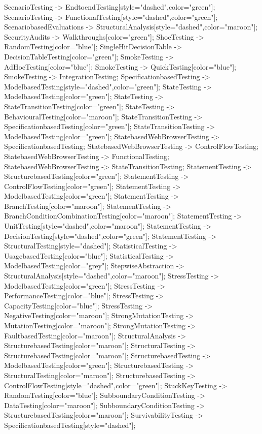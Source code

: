 \documentclass{article}
\begin{document}
{ScenarioTesting -> EndtoendTesting[style="dashed",color="green"];
ScenarioTesting -> FunctionalTesting[style="dashed",color="green"];
ScenariobasedEvaluations -> StructuralAnalysis[style="dashed",color="maroon"];
SecurityAudits -> Walkthroughs[color="green"];
ShoeTesting -> RandomTesting[color="blue"];
SingleHitDecisionTable -> DecisionTableTesting[color="green"];
SmokeTesting -> AdHocTesting[color="blue"];
SmokeTesting -> QuickTesting[color="blue"];
SmokeTesting -> IntegrationTesting;
SpecificationbasedTesting -> ModelbasedTesting[style="dashed",color="green"];
StateTesting -> ModelbasedTesting[color="green"];
StateTesting -> StateTransitionTesting[color="green"];
StateTesting -> BehaviouralTesting[color="maroon"];
StateTransitionTesting -> SpecificationbasedTesting[color="green"];
StateTransitionTesting -> ModelbasedTesting[color="green"];
StatebasedWebBrowserTesting -> SpecificationbasedTesting;
StatebasedWebBrowserTesting -> ControlFlowTesting;
StatebasedWebBrowserTesting -> FunctionalTesting;
StatebasedWebBrowserTesting -> StateTransitionTesting;
StatementTesting -> StructurebasedTesting[color="green"];
StatementTesting -> ControlFlowTesting[color="green"];
StatementTesting -> ModelbasedTesting[color="green"];
StatementTesting -> BranchTesting[color="maroon"];
StatementTesting -> BranchConditionCombinationTesting[color="maroon"];
StatementTesting -> UnitTesting[style="dashed",color="maroon"];
StatementTesting -> DecisionTesting[style="dashed",color="green"];
StatementTesting -> StructuralTesting[style="dashed"];
StatisticalTesting -> UsagebasedTesting[color="blue"];
StatisticalTesting -> ModelbasedTesting[color="grey"];
StepwiseAbstraction -> StructuralAnalysis[style="dashed",color="maroon"];
StressTesting -> ModelbasedTesting[color="green"];
StressTesting -> PerformanceTesting[color="blue"];
StressTesting -> CapacityTesting[color="blue"];
StressTesting -> NegativeTesting[color="maroon"];
StrongMutationTesting -> MutationTesting[color="maroon"];
StrongMutationTesting -> FaultbasedTesting[color="maroon"];
StructuralAnalysis -> StructurebasedTesting[color="maroon"];
StructuralTesting -> StructurebasedTesting[color="maroon"];
StructurebasedTesting -> ModelbasedTesting[color="green"];
StructurebasedTesting -> StructuralTesting[color="maroon"];
StructurebasedTesting -> ControlFlowTesting[style="dashed",color="green"];
StuckKeyTesting -> RandomTesting[color="blue"];
SubboundaryConditionTesting -> DataTesting[color="maroon"];
SubboundaryConditionTesting -> StructurebasedTesting[color="maroon"];
SurvivabilityTesting -> SpecificationbasedTesting[style="dashed"];
}
\end{document}
